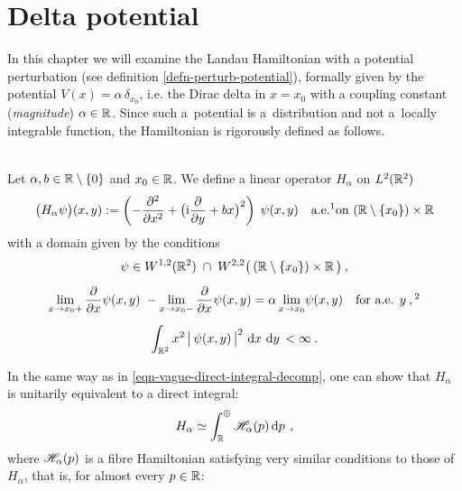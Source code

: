 \chapter{Delta potential} \label{chapter-dirac}
In this chapter we will examine the Landau Hamiltonian with a potential perturbation (see definition \ref{defn-perturb-potential}), formally given by the potential $V(x) = \alpha\,\delta_{x_0}$, i.e. the Dirac delta in $x=x_0$ with a coupling constant (\textit{magnitude}) $\alpha \in \mathbb{R}$. Since such a~potential is a~distribution and not a~locally integrable function, the Hamiltonian is rigorously defined as follows.
\begin{defn}
    \label{defn-hamiltonian-dirac}
    \\
    Let $\alpha, b \in \mathbb{R} \setminus \{ 0 \}$ and $x_0 \in \mathbb{R}$. We define a linear operator $H_\alpha$ on $L^2(\mathbb{R}^2)$
    \begin{equation*}
        \big( H_\alpha \psi \big)(x, y) := \left( -\pd{^2}{x^2} + \big( \i\pd{}{y} + bx \big)^2 \right) \; \psi(x,y)
        \quad \text{a.e.\footnotemark on } (\R \setminus \{ x_0 \}) \times \R
    \end{equation*}
    with a domain given by the conditions
    \begin{gather*}
        \psi \in W^{1,2}(\R^2) \; \cap \; W^{2,2}\big( \,(\R \setminus \{ x_0 \}) \times \R \, \big) \: ,
        \\[5pt]
        \lim_{x \to x_0 +} \pd{}{x}\psi(x,y)\; - \lim_{x \to x_0 -} \pd{}{x}\psi(x,y) = \alpha \lim_{x \to x_0} \!\psi(x, y)
        \quad \text{for a.e. } y \: ,\footnotemark
        \\[5pt]
        \int_{\R^2} x^2 \, \big|\, \psi(x,y) \,\big|^2 \, \d{x}\d{y} < \infty \: .
    \end{gather*}
\end{defn}
In the same way as in \eqref{eqn-vague-direct-integral-decomp}, one can show that $H_\alpha$ is unitarily equivalent to a direct integral:
\begin{equation*}
    H_\alpha \simeq \int^\oplus_{\mathbb{R}} \mathscr{H}_\alpha(p) \, \mathrm{d}p \, \: ,
\end{equation*}
where $\mathscr{H}_\alpha(p)$ is a fibre Hamiltonian satisfying very similar conditions to those of~$H_\alpha$, that is, for almost every $p \in \mathbb{R}$:
